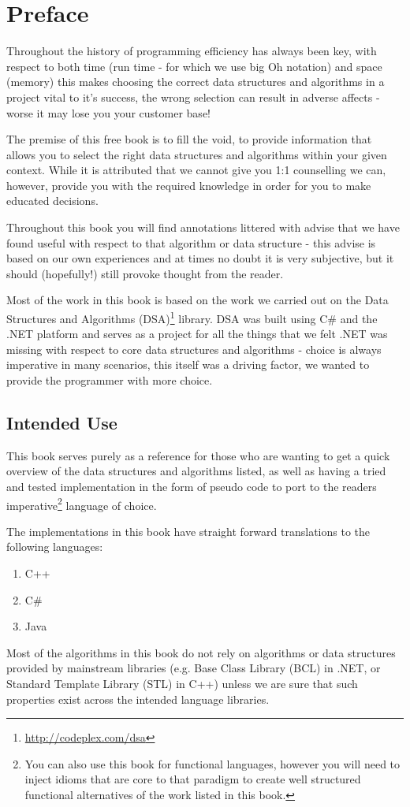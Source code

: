 \chapter*{Preface}
Throughout the history of programming efficiency has always been key, with respect to both time (run time - for which we use big Oh notation) and space (memory) this makes choosing the correct data structures and algorithms in a project vital to it's success, the wrong selection can result in adverse affects - worse it may lose you your customer base!

The premise of this free book is to fill the void, to provide information that allows you to select the right data structures and algorithms within your given context. While it is attributed that we cannot give you 1:1 counselling we can, however, provide you with the required knowledge in order for you to make educated decisions.

Throughout this book you will find annotations littered with advise that we have found useful with respect to that algorithm or data structure - this advise is based on our own experiences and at times no doubt it is very subjective, but it should (hopefully!) still provoke thought from the reader.

Most of the work in this book is based on the work we carried out on the Data Structures and Algorithms (DSA)\footnote{\url{http://codeplex.com/dsa}} library. DSA was built using C\# and the .NET platform and serves as a project for all the things that we felt .NET was missing with respect to core data structures and algorithms - choice is always imperative in many scenarios, this itself was a driving factor, we wanted to provide the programmer with more choice.

\section*{Intended Use}
This book serves purely as a reference for those who are wanting to get a quick overview of the data structures and algorithms listed, as well as having a tried and tested implementation in the form of pseudo code to port to the readers imperative\footnote{You can also use this book for functional languages, however you will need to inject idioms that are core to that paradigm to create well structured functional alternatives of the work listed in this book.} language of choice.

The implementations in this book have straight forward translations to the following languages:

\begin{enumerate}
\item C++
\item C\#
\item Java
\end{enumerate}

Most of the algorithms in this book do not rely on algorithms or data structures provided by mainstream libraries (e.g. Base Class Library (BCL) in .NET, or Standard Template Library (STL) in C++) unless we are sure that such properties exist across the intended language libraries.
